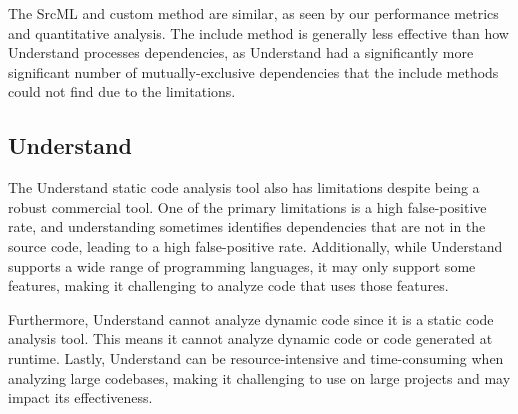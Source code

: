 \documentclass[12pt, dvipsnames, a4paper]{article}
\begin{document}
The SrcML and custom method are similar, as seen by our performance metrics and quantitative analysis. The include method is generally less effective than how Understand processes dependencies, as Understand had a significantly more significant number of mutually-exclusive dependencies that the include methods could not find due to the limitations.

\subsection{Understand}
The Understand static code analysis tool also has limitations despite being a robust commercial tool. One of the primary limitations is a high false-positive rate, and understanding sometimes identifies dependencies that are not in the source code, leading to a high false-positive rate. Additionally, while Understand supports a wide range of programming languages, it may only support some features, making it challenging to analyze code that uses those features.

Furthermore, Understand cannot analyze dynamic code since it is a static code analysis tool. This means it cannot analyze dynamic code or code generated at runtime. Lastly, Understand can be resource-intensive and time-consuming when analyzing large codebases, making it challenging to use on large projects and may impact its effectiveness.
\end{document}

